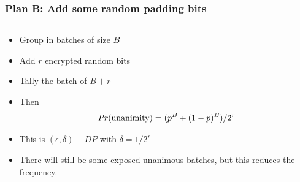 \documentclass[10pt,xcolor=svgnames,169]{beamer} %
\begin{document}
\begin{frame}
	\frametitle{Plan B: Add some random padding bits}
		\begin{columns}
		\begin{column}{0.7\textwidth}
	\begin{itemize}
		\item 	Group in batches of size $B$
\item Add $r$ encrypted random bits
\item Tally the batch of $B+r$
	\item Then $$\mathit{Pr}(\text{unanimity}) = (p^B + (1-p)^B)/2^r$$
	\item This is $(\epsilon,\delta)-DP$ with $\delta = 1/2^r$



\item There will still be some exposed unanimous batches, but this reduces the frequency.


\end{itemize}
\end{column}
\end{columns}
\end{frame}
\end{document}
